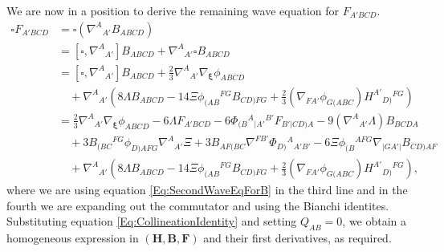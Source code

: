 \documentclass[10pt,a4paper]{article}
\theoremstyle{plain}
\def\bmB{{\bm B}}
\def\bmF{{\bm F}}
\def\bmH{{\bm H}}
\begin{document}
We are now in a position to derive the remaining wave equation for
$F_{A'BCD}$.
\begin{align}
    \square F_{A'BCD} &= \square (\nabla^A{}_{A'}B_{ABCD}) \nonumber\\
    &= \left[\square, \nabla^A{}_{A'}\right] B_{ABCD} + \nabla^A{}_{A'}\square B_{ABCD} \\
    &= \left[\square, \nabla^A{}_{A'}\right] B_{ABCD} + \tfrac{2}{3}\nabla^A{}_{A'}\nabla_{\bm\xi}\phi_{ABCD} \nonumber\\
    &\quad+ \nabla^A{}_{A'}\left(8\Lambda B_{ABCD} - 14\Xi \phi_{(AB}{}^{FG}B_{CD)FG} + \tfrac{2}{3}(\nabla_{FA'}\phi_{G(ABC})H^{A'}{}_{D)}{}^{FG}\right)\nonumber\\
    &=   \tfrac{2}{3}\nabla^A{}_{A'}\nabla_{\bm\xi}\phi_{ABCD} -6 \Lambda F_{A'BCD} - 6 \Phi_{(B}{}^{A}{}_{\vert A'}{}^{B'} F_{B'\vert CD)A} - 9 (\nabla^{A}{}_{A'}\Lambda)B_{BCDA} \nonumber \\
    &\quad + 3B_{(BC}{}^{FG} \phi_{D)AFG} \nabla^{A}{}_{A'}\Xi  + 3B_{AF(BC} \nabla^{FB'}\Phi_{D)}{}^{A}{}_{A'B'}  - 6 \Xi \phi_{(B}{}^{AFG} \nabla_{\vert GA'\vert}B_{CD)AF} \nonumber\\
    &\quad + \nabla^A{}_{A'}\left(8\Lambda B_{ABCD} - 14\Xi \phi_{(AB}{}^{FG}B_{CD)FG} + \tfrac{2}{3}(\nabla_{FA'}\phi_{G(ABC})H^{A'}{}_{D)}{}^{FG}\right) \label{Eq:WaveEqForF},
\end{align}
where we are using equation \eqref{Eq:SecondWaveEqForB} in the third line and
in the fourth we are expanding out the commutator and using the
Bianchi identites. Substituting equation
\eqref{Eq:CollineationIdentity} and setting $Q_{AB}=0$, we obtain a
homogeneous expression in $(\bmH, \bmB,\bmF)$ and their first
derivatives, as required.  \\
\end{document}
